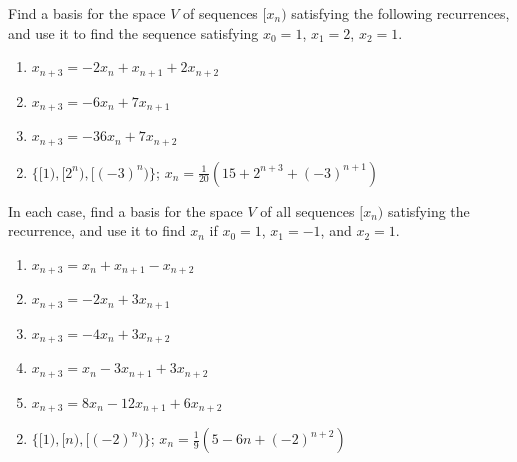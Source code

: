 \begin{multicols}{2}
\begin{ex}
Find a basis for the space $V$ of sequences $[x_{n})$ satisfying the following recurrences, and use it to find the sequence satisfying $x_{0} = 1$, $x_{1} = 2$, $x_{2} = 1$.


\begin{enumerate}[label={\alph*.}]
\item $x_{n+3} = -2x_{n} + x_{n+1} + 2x_{n+2}$

\item $x_{n+3} = -6x_{n} + 7x_{n+1}$

\item $x_{n+3} = -36x_{n} + 7x_{n+2}$

\end{enumerate}
\begin{sol}
\begin{enumerate}[label={\alph*.}]
\setcounter{enumi}{1}
\item  $\{[1), [2^n), [(-3)^n)\}$; $x_n = \frac{1}{20}(15 + 2^{n+3} + (-3)^{n+1})$

\end{enumerate}
\end{sol}
\end{ex}

\begin{ex}
In each case, find a basis for the space $V$ of all sequences $[x_{n})$ satisfying the recurrence, and use it to find $x_{n}$ if $x_{0} = 1$, $x_{1} = -1$, and $x_{2} = 1$.


\begin{enumerate}[label={\alph*.}]
\item $x_{n+3} = x_{n} + x_{n+1} - x_{n+2}$

\item $x_{n+3} = -2x_{n} + 3x_{n+1}$

\item $x_{n+3} = -4x_{n} + 3x_{n+2}$

\item $x_{n+3} = x_{n} - 3x_{n+1} + 3x_{n+2}$

\item $x_{n+3} = 8x_{n} - 12x_{n+1} + 6x_{n+2}$

\end{enumerate}
\begin{sol}
\begin{enumerate}[label={\alph*.}]
\setcounter{enumi}{1}
\item $\{[1), [n), [(-2)^n)\}$; $x_n = \frac{1}{9}(5 -6n + (-2)^{n+2})$


\end{enumerate}
\end{sol}
\end{ex}
\end{multicols}
